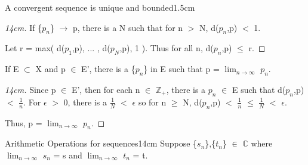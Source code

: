 \begin{ltheorem}{A convergent sequence is unique and bounded}{1.5cm}
            \begin{proof}[14cm]
                If \{$p_n$\} $\rightarrow$ p,
                there is a N such that for n $>$ N, d($p_n$,p) $<$ 1.

                Let r = max( d($p_1$,p), ... , d($p_N$,p), 1 ).
                Thus for all n, d($p_n$,p) $\leq$ r.                
            \end{proof}

        \item If E $\subset$ X and p $\in$ E', there is a \{$p_n$\}
            in E such that p = $\lim_{n \rightarrow \infty}$ $p_n$.

            \begin{proof}[14cm]
                Since p $\in$ E', then for each n $\in$ $\mathbb{Z}_+$,
                there is a $p_n$ $\in$ E such that d($p_n$,p) $<$ $\frac{1}{n}$.
                For $\epsilon$ $>$ 0, there is a $\frac{1}{N}$ $<$ $\epsilon$
                so for n $\geq$ N,
                d($p_n$,p) $<$ $\frac{1}{n}$ $\leq$ $\frac{1}{N}$ $<$ $\epsilon$.

                Thus, p = $\lim_{n \rightarrow \infty}$ $p_n$.                
            \end{proof}
    \end{ltheorem}

    \vspace{0.5cm}



    \begin{wtheorem}{Arithmetic Operations for sequences}{14cm}
        Suppose \{$s_n$\},\{$t_n$\} $\in$ $\mathbb{C}$ where
        $\lim_{n \rightarrow \infty}$ $s_n$ = s and
        $\lim_{n \rightarrow \infty}$ $t_n$ = t.
    \end{wtheorem}

